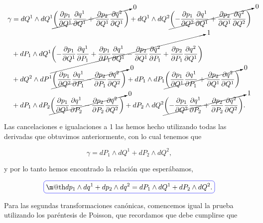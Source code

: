 \documentclass[a4paper,10pt]{article}
\makeatletter
\numberwithin{equation}{section}
\newcommand*{\boxcolor}{blue}
\renewcommand{\boxed}[1]{\textcolor{\boxcolor}{%
\tikz[baseline={([yshift=-1ex]current bounding box.center)}] \node [rectangle, minimum width=1ex,rounded corners,draw] {\normalcolor\m@th$\displaystyle#1$};}}
\makeatother
\begin{document}
\begin{align*}
 \gamma &= dQ^1 \wedge dQ^1 \cancelto{0}{\left(\frac{\partial p_1}{\partial Q^1}\frac{\partial q^1}{\partial Q^1} 
 + \frac{\partial p_2}{\partial Q^1}\frac{\partial q^2}{\partial Q^1}\right)} + 
 dQ^1 \wedge dQ^2 \cancelto{0}{\left(- \frac{\partial p_1}{\partial Q^2}\frac{\partial q^1}{\partial Q^1} 
 +  \frac{\partial p_2}{\partial Q^1}\frac{\partial q^2}{\partial Q^2}\right)} \\
 &+ dP_1 \wedge dQ^1 \cancelto{1}{\left(- \frac{\partial p_1}{\partial Q^1}\frac{\partial q^1}{\partial P_1}
 + \frac{\partial p_1}{\partial P_1}\frac{\partial q^1}{\partial Q^1} 
 - \frac{\partial p_2}{\partial Q^1}\frac{\partial q^2}{\partial P_1} 
 + \frac{\partial p_2}{\partial P_1}\frac{\partial q^2}{\partial Q^1}\right)} \\
 &+ dQ^2 \wedge dP^1 \cancelto{0}{\left(\frac{\partial p_1}{\partial Q^2}\frac{\partial q^1}{\partial P_1} - 
 \frac{\partial p_2}{\partial P_1}\frac{\partial q^2}{\partial Q^2} \right)}
 + dP_1 \wedge dP_1 \cancelto{0}{\left(\frac{\partial p_1}{\partial Q^1}\frac{\partial q^1}{\partial P_1}
 + \frac{\partial p_2}{\partial Q^1}\frac{\partial q^2}{\partial Q^1}\right)} \\
 &+ dP_1 \wedge dP_2 \cancelto{0}{\left(\frac{\partial p_1}{\partial Q^1}\frac{\partial q^1}{\partial P_2} 
 - \frac{\partial p_2}{\partial P_2}\frac{\partial q^2}{\partial Q^2}\right)}
 + dP_2 \wedge dQ^2 \cancelto{1}{\left(- \frac{\partial p_1}{\partial Q^2}\frac{\partial q^1}{\partial P_2}
 + \frac{\partial p_2}{\partial P_2}\frac{\partial q^2}{\partial Q^2} \right)}.
\end{align*}

Las cancelaciones e igualaciones a 1 las hemos hecho utilizando todas las derivadas 
que obtuvimos anteriormente, con lo cual tenemos que 

\begin{equation}
 \gamma = dP_1 \wedge dQ^1 + dP_2 \wedge dQ^2,
\end{equation}

y por lo tanto hemos encontrado la relación que esperábamos,

\begin{equation}
 \boxed{dp_1 \wedge dq^1 + dp_2 \wedge dq^2 = dP_1 \wedge dQ^1 + dP_2 \wedge dQ^2.}
\end{equation}

\vspace{.3cm}

Para las segundas transformaciones canónicas, comencemos igual la prueba utilizando 
los paréntesis de Poisson, que recordamos que debe cumplirse que 
\end{document}
